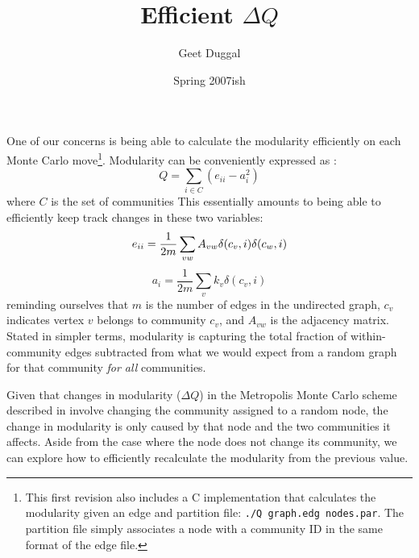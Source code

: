 \documentclass{article}
\title{Efficient $\Delta Q$}
\author{Geet Duggal}
\date{Spring 2007ish}
\begin{document}
\maketitle

One of our concerns is being able to calculate the 
modularity efficiently on each Monte Carlo move\footnote{This first revision
also includes a C implementation that calculates the modularity 
given an edge and partition file: \texttt{./Q graph.edg nodes.par}. The
partition file simply associates a node with a community ID in the same format
of the edge file.}.  Modularity can be
conveniently expressed as \cite{cnm-community}:
\begin{equation}
Q = \displaystyle\sum_{i \in C}(e_{ii}-a_i^2)
\end{equation}
where $C$ is the set of communities
This essentially amounts
to being able to efficiently keep track changes in these two variables:
\begin{equation}
\label{edgefrac}
e_{ii} = \frac{1}{2m}\displaystyle\sum_{vw}A_{vw}\delta(c_v, i)\delta(c_w, i)\\
\end{equation}
\begin{equation}
\label{rootprob}
a_i = \frac{1}{2m}\displaystyle\sum_vk_v\delta(c_v, i)
\end{equation}
reminding ourselves that $m$ is the number of edges in the undirected graph,
$c_v$ indicates vertex $v$ belongs to community $c_v$, and $A_{vw}$ is the
adjacency matrix.  Stated in simpler terms, modularity is capturing
the total fraction of within-community edges subtracted
from what we would expect from a random graph for that community 
\emph{for all} communities.

Given that changes in modularity ($\Delta Q$) in the Metropolis Monte Carlo 
scheme described in \cite{massen-doye-community} involve changing the community assigned
to a random node, the change in modularity is only caused by that node and
the two communities it affects.  Aside from the case where the node does
not change its community, we can explore how to efficiently recalculate 
the modularity from the previous value.  
\end{document}
